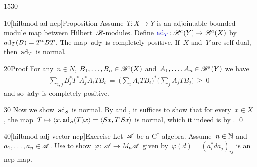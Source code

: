 \begin{parsec}{1530}%
\begin{point}{10}[hilbmod-ad-ncp]{Proposition}%
Assume~$T \colon X \to Y$ is an adjointable bounded module map
    between Hilbert~$\mathscr{B}$-modules.
    Define $\Define{\ad_T}\colon \scrB^a(Y) \to \scrB^a(X)$
    by~$\mathrm{ad}_T (B) = T^*BT$.
The map~$\mathrm{ad}_T$ is completely positive.
If~$X$ and~$Y$ are self-dual,
    then~$\mathrm{ad}_T$ is normal.
\begin{point}{20}{Proof}%
For any~$n \in N$, $B_1,\ldots, B_n \in \mathscr{B}^a(X)$
    and~$A_1,\ldots,A_n \in \mathscr{B}^a(Y)$
    we have
\begin{align*}
    \sum_{i,j} B_j^* T^* A_j^*A_i T B_i \ = \ 
    \bigl( \sum_i A_i T B_i \bigr)^*
    \bigl( \sum_j A_j T B_j \bigr) \ \geq\  0
\end{align*}
and so~$\mathrm{ad}_T$ is completely positive.
\end{point}
\begin{point}{30}%
Now we show~$\mathrm{ad}_S$ is normal.
By  and ,
    it suffices to show that
    for every~$x\in X$, the
    map~$T \mapsto \langle x, \mathrm{ad}_S (T) x\rangle
                = \langle S x, T \, S x\rangle$
    is normal,
    which it indeed is by . \qed
\end{point}
\end{point}
\begin{point}{40}[hilbmod-adj-vector-ncp]{Exercise}%
Let~$\mathscr{A}$ be a C$^*$-algebra.
Assume~$n \in \mathbb{N}$ and  $a_1, \ldots, a_n \in \mathscr{A}$.
Use 
to show~$\varphi \colon \mathscr{A} \to M_n \mathscr{A}$
    given by~$\varphi(d) = (a_i^*da_j)_{ij}$
    is an ncp-map.
\end{point}
\end{parsec}

